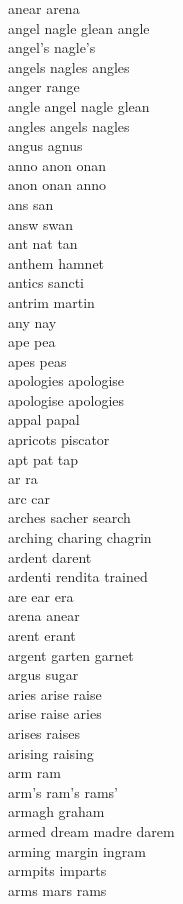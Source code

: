 anear arena\\
angel nagle glean angle\\
angel's nagle's\\
angels nagles angles\\
anger range\\
angle angel nagle glean\\
angles angels nagles\\
angus agnus\\
anno anon onan\\
anon onan anno\\
ans san\\
answ swan\\
ant nat tan\\
anthem hamnet\\
antics sancti\\
antrim martin\\
any nay\\
ape pea\\
apes peas\\
apologies apologise\\
apologise apologies\\
appal papal\\
apricots piscator\\
apt pat tap\\
ar ra\\
arc car\\
arches sacher search\\
arching charing chagrin\\
ardent darent\\
ardenti rendita trained\\
are ear era\\
arena anear\\
arent erant\\
argent garten garnet\\
argus sugar\\
aries arise raise\\
arise raise aries\\
arises raises\\
arising raising\\
arm ram\\
arm's ram's rams'\\
armagh graham\\
armed dream madre darem\\
arming margin ingram\\
armpits imparts\\
arms mars rams\\
